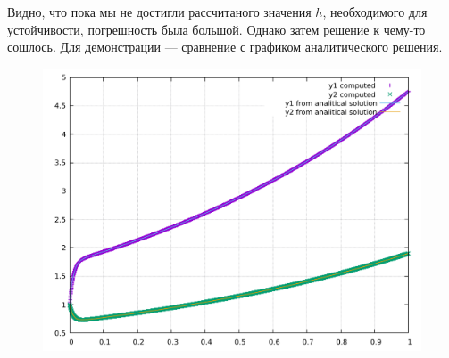 \documentclass[11pt]{article}
\begin{document}
Видно, что пока мы не достигли рассчитаного значения $h$, необходимого для устойчивости, погрешность была большой. Однако затем решение к чему-то сошлось. Для демонстрации --- сравнение с графиком аналитического решения.
\begin{figure}[H]
\centering
\includegraphics[width=0.65\linewidth]{graph.pdf}
\end{figure}





 
\end{document}
